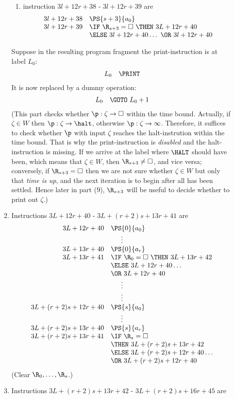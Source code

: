 \begin{enumerate}[1.]
\begin{enumerate}[(1)]
\begin{enumerate}[1)]
\item instruction $3l + 12r + 38$ - $3l + 12r + 39$ are
\[
\begin{array}{rl}
3l + 12r + 38 & \PS{s + 3}{a_0} \cr
3l + 12r + 39 & \IF \ \R_{s + 3} = \Box \ \THEN \ 3L + 12r + 40 \cr
\             & \ELSE \ 3l + 12r + 40 \ldots \ \OR \ 3l + 12r + 40
\end{array}
\]
\end{enumerate}
Suppose in the resulting program fragment the print-instruction is at label $L_0$:
\[
\begin{array}{rl}
L_0 & \PRINT
\end{array}
\]
It is now replaced by a dummy operation:
\[
\begin{array}{rl}
L_0 & \GOTO \ L_0 + 1
\end{array}
\]
(This part checks whether $\p : \zeta \to \Box$ within the time bound. Actually, if $\zeta \in W$ then $\p : \zeta \to \halt$, otherwise $\p : \zeta \to \infty$. Therefore, it suffices to check whether $\p$ with input $\zeta$ reaches the halt-instrution within the time bound. That is why the print-instruction is \emph{disabled} and the halt-instruction is missing. If we arrive at the label where $\HALT$ should have been, which means that $\zeta \in W$, then $\R_{s + 3} \neq \Box$, and vice versa; conversely, if $\R_{s + 3} = \Box$ then we are not sure whether $\zeta \in W$ but only that \emph{time is up}, and the next iteration is to begin after all has been settled. Hence later in part (9), $\R_{s + 3}$ will be useful to decide whether to print out $\zeta$.)
\item Instructions $3L + 12r + 40$ - $3L + (r + 2)s + 13r + 41$ are
\[
\begin{array}{rl}
3L + 12r + 40 & \PS{0}{a_0} \cr
\multicolumn{2}{c}{\vdots} \cr
3L + 13r + 40 & \PS{0}{a_r} \cr
3L + 13r + 41 & \IF \ \R_0 = \Box \ \THEN \ 3L + 13r + 42 \cr
\ & \ELSE \ 3L + 12r + 40 \ldots \cr
\ & \OR \ 3L + 12r + 40 \cr
\multicolumn{2}{c}{\vdots} \cr
\multicolumn{2}{c}{\vdots} \cr
3L + (r + 2)s + 12r + 40 & \PS{s}{a_0} \cr
\multicolumn{2}{c}{\vdots} \cr
3L + (r + 2)s + 13r + 40 & \PS{s}{a_r} \cr
3L + (r + 2)s + 13r + 41 & \IF \ \R_s = \Box \cr
\ & \THEN \ 3L + (r + 2)s + 13r + 42 \cr
\ & \ELSE \ 3L + (r + 2)s + 12r + 40 \ldots \cr
\ & \OR \ 3L + (r + 2)s + 12r + 40 \cr
\end{array}
\]
(Clear $\R_0, \ldots, \R_s$.)
\item Instructions $3L + (r + 2)s + 13r + 42$ - $3L + (r + 2)s + 16r + 45$ are
\[
\begin{array}{rl}

\end{array}\]
\end{enumerate}
\end{enumerate}
